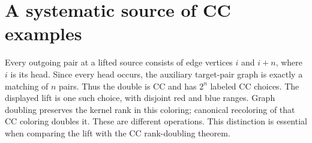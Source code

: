 \section{A systematic source of CC examples}
Every outgoing pair at a lifted source consists of edge vertices $i$
and $i+n$, where $i$ is its head. Since every head occurs, the auxiliary
target-pair graph is exactly a matching of $n$ pairs. Thus the double is
CC and has $2^n$ labeled CC choices. The displayed lift is one such
choice, with disjoint red and blue ranges.
Graph doubling preserves the kernel rank in this coloring; canonical
recoloring of that CC coloring doubles it. These are different operations.
This distinction is essential when comparing the lift with the CC
rank-doubling theorem.
